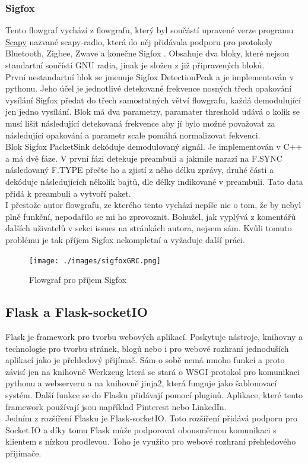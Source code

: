 \documentclass{ctuthesis}
\begin{document}
\subsubsection{Sigfox}
Tento flowgraf vychází z flowgrafu, který byl součástí upravené verze programu \href{https://scapy.net}{Scapy} nazvané scapy-radio, která do něj přidávala podporu pro protokoly Bluetooth, Zigbee, Zwave a konečne Sigfox \cite{cybertools2016}. Obsahuje dva bloky, které nejsou standartní součístí GNU radia, jinak je složen z již připravených bloků.\\
První nestandartní blok se jmenuje Sigfox DetectionPeak a je implementován v pythonu. Jeho účel je jednotlivé detekované frekvence nosných třech opakování vysílání Sigfox předat do třech samostatných větví flowgrafu, každá demodulující jen jedno vysílání. Blok má dva parametry, paramater threshold udává o kolik se musí lišit následující detekovaná frekvence aby jí bylo možné považovat za následující opakování a parametr scale pomáhá normalizovat fekvenci.\\
Blok Sigfox PacketSink dekóduje demodulovaný signál. Je implementován v C++ a má dvě fáze. V první fázi detekuje preambuli a jakmile narazí na F.SYNC následovaný F.TYPE přečte ho a zjistí z něho délku zprávy, druhé části a dekóduje následujících několik bajtů, dle délky indikované v preambuli. Tato data přidá k preambuli a vytvoří paket.\\
I přestože autor flowgrafu, ze kterého tento vychází nepíše nic o tom, že by nebyl plně funkční, nepodařilo se mi ho zprovoznit. Bohužel, jak vyplývá z komentářů dalších uživatelů v sekci issues na stránkách autora, nejsem sám. Kvůli tomuto problému je tak příjem Sigfox nekompletní a vyžaduje další práci.
\begin{figure}
\caption{Flowgraf pro příjem Sigfox}
\texttt{[image: ./images/sigfoxGRC.png]}
\label{sigfoxGRC}
\end{figure}

\subsection{Flask a Flask-socketIO}
Flask je framework pro tvorbu webových aplikací. Poskytuje nástroje, knihovny a technologie pro tvorbu stránek, blogů nebo i pro webové rozhraní jednoduších aplikací jako je přehledový přijímač. Sám o sobě nemá mnoho funkcí a proto závisí jen na knihovně Werkzeug která se stará o WSGI protokol pro komunikaci pythonu a webserveru a na knihovně jinja2, která funguje jako šablonovací systém. Další funkce se do Flasku přidávají pomocí pluginů. Aplikace, které tento framework používají jsou například Pinterest nebo LinkedIn. \cite{flaskwiki} \\
Jedním z rozšíření Flasku je Flask-socketIO. Toto rozšíření přidává podporu pro Socket.IO a díky tomu Flask může podporovat obousměrnou komunikaci s klientem s nízkou prodlevou. Toho je využito pro webové rozhraní přehledového přijímače.
\end{document}

